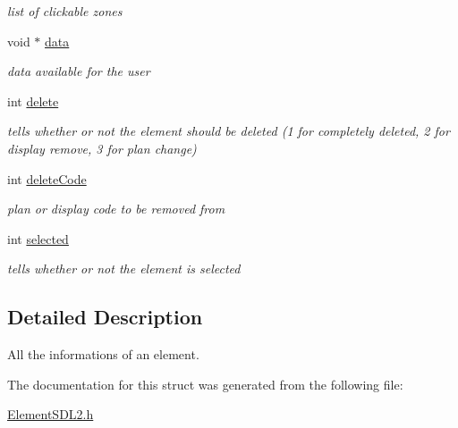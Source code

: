 \begin{DoxyCompactItemize}
\begin{DoxyCompactList}\small\item\em list of clickable zones \end{DoxyCompactList}\item 
void $\ast$ \hyperlink{structElementSDL2_abca7de78cc7e420d98d24a955563c7cc}{data}\hypertarget{structElementSDL2_abca7de78cc7e420d98d24a955563c7cc}{}\label{structElementSDL2_abca7de78cc7e420d98d24a955563c7cc}

\begin{DoxyCompactList}\small\item\em data available for the user \end{DoxyCompactList}\item 
int \hyperlink{structElementSDL2_a59d6b7086533d8d7da883bc882c4ef6d}{delete}\hypertarget{structElementSDL2_a59d6b7086533d8d7da883bc882c4ef6d}{}\label{structElementSDL2_a59d6b7086533d8d7da883bc882c4ef6d}

\begin{DoxyCompactList}\small\item\em tells whether or not the element should be deleted (1 for completely deleted, 2 for display remove, 3 for plan change) \end{DoxyCompactList}\item 
int \hyperlink{structElementSDL2_a1f8620d697afd711263d20dd82077cd0}{delete\+Code}\hypertarget{structElementSDL2_a1f8620d697afd711263d20dd82077cd0}{}\label{structElementSDL2_a1f8620d697afd711263d20dd82077cd0}

\begin{DoxyCompactList}\small\item\em plan or display code to be removed from \end{DoxyCompactList}\item 
int \hyperlink{structElementSDL2_a2cae92fe5dd207db485261128b82bc02}{selected}\hypertarget{structElementSDL2_a2cae92fe5dd207db485261128b82bc02}{}\label{structElementSDL2_a2cae92fe5dd207db485261128b82bc02}

\begin{DoxyCompactList}\small\item\em tells whether or not the element is selected \end{DoxyCompactList}\end{DoxyCompactItemize}


\subsection{Detailed Description}
All the informations of an element. 

The documentation for this struct was generated from the following file\+:\begin{DoxyCompactItemize}
\item 
\hyperlink{ElementSDL2_8h}{Element\+S\+D\+L2.\+h}\end{DoxyCompactItemize}
